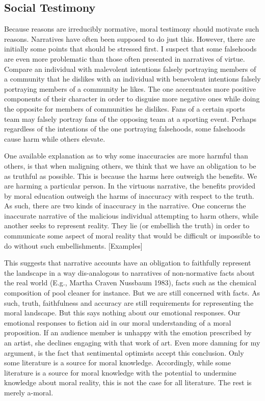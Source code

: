 \documentclass[12pt]{book}
\theoremstyle{definition}
\theoremstyle{remark}
\begin{document}
\subsection*{Social Testimony}\label{social-testimony}

Because reasons are irreducibly normative, moral testimony should motivate such reasons. Narratives have often been supposed to do just this. However, there are initially some points that should be stressed first. I suspect that some falsehoods are even more problematic than those often presented in narratives of virtue. Compare an individual with malevolent intentions falsely portraying members of a community that he dislikes with an individual with benevolent intentions falsely portraying members of a community he likes. The one accentuates more positive components of their character in order to disguise more negative ones while doing the opposite for members of communities he dislikes. Fans of a certain sports team may falsely portray fans of the opposing team at a sporting event. Perhaps regardless of the intentions of the one portraying falsehoods, some falsehoods cause harm while others elevate.

One available explanation as to why some inaccuracies are more harmful than others, is that when maligning others, we think that we have an obligation to be as truthful as possible. This is because the harms here outweigh the benefits. We are harming a particular person. In the virtuous narrative, the benefits provided by moral education outweigh the harms of inaccuracy with respect to the truth. As such, there are two kinds of inaccuracy in the narrative. One concerns the inaccurate narrative of the malicious individual attempting to harm others, while another seeks to represent reality. They lie (or embellish the truth) in order to communicate some aspect of moral reality that would be difficult or impossible to do without such embellishments. {[}Examples{]}

This suggests that narrative accounts have an obligation to faithfully represent the landscape in a way dis-analogous to narratives of non-normative facts about the real world (E.g., Martha Craven Nussbaum 1983), facts such as the chemical composition of pool cleaner for instance. But we are still concerned with facts. As such, truth, faithfulness and accuracy are still requirements for representing the moral landscape. But this says nothing about our emotional responses. Our emotional responses to fiction aid in our moral understanding of a moral proposition. If an audience member is unhappy with the emotion prescribed by an artist, she declines engaging with that work of art. Even more damning for my argument, is the fact that sentimental optimists accept this conclusion. Only some literature is a source for moral knowledge. Accordingly, while some literature is a source for moral knowledge with the potential to undermine knowledge about moral reality, this is not the case for all literature. The rest is merely a-moral.
\end{document}
